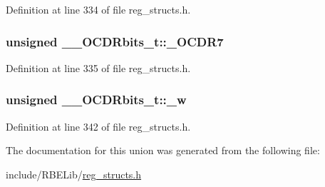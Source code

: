 Definition at line 334 of file reg\+\_\+structs.\+h.

\hypertarget{union_____o_c_d_rbits__t_a025b9fbbc0b87781063bc278b5337aca}{
\subsubsection[{\+\_\+\+O\+C\+D\+R7}]{\setlength{\rightskip}{0pt plus 5cm}unsigned \+\_\+\+\_\+\+O\+C\+D\+Rbits\+\_\+t\+::\+\_\+\+O\+C\+D\+R7}}\label{union_____o_c_d_rbits__t_a025b9fbbc0b87781063bc278b5337aca}


Definition at line 335 of file reg\+\_\+structs.\+h.

\hypertarget{union_____o_c_d_rbits__t_a26f35366ea5390befe3dfda9cf6142fe}{
\subsubsection[{\+\_\+w}]{\setlength{\rightskip}{0pt plus 5cm}unsigned \+\_\+\+\_\+\+O\+C\+D\+Rbits\+\_\+t\+::\+\_\+w}}\label{union_____o_c_d_rbits__t_a26f35366ea5390befe3dfda9cf6142fe}


Definition at line 342 of file reg\+\_\+structs.\+h.



The documentation for this union was generated from the following file\+:\begin{DoxyCompactItemize}
\item 
include/\+R\+B\+E\+Lib/\hyperlink{reg__structs_8h}{reg\+\_\+structs.\+h}\end{DoxyCompactItemize}

